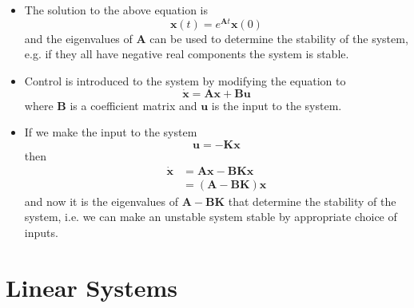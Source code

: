 \documentclass{article}
\renewcommand{\vec}[1]{\boldsymbol{\mathbf{#1}}}
\newcommand{\dvec}[1]{\dot{\vec{#1}}}
\begin{document}
\begin{itemize}
  \item The solution to the above equation is \[\vec{x}(t) = e^{\vec{A} t} \vec{x}(0)\] and the eigenvalues of $\vec{A}$ can be used to determine the stability of the system, e.g. if they all have negative real components the system is stable.

  \item Control is introduced to the system by modifying the equation to \[\dvec{x} = \vec{A} \vec{x} + \vec{B} \vec{u}\] where $\vec{B}$ is a coefficient matrix and $\vec{u}$ is the input to the system.

  \item If we make the input to the system \[\vec{u} = -\vec{K} \vec{x}\] then \begin{align*}
          \dvec{x} & = \vec{A} \vec{x} - \vec{B} \vec{K} \vec{x} \\
                   & = (\vec{A} - \vec{B} \vec{K}) \vec{x}
        \end{align*} and now it is the eigenvalues of $\vec{A} - \vec{B} \vec{K}$ that determine the stability of the system, i.e. we can make an unstable system stable by appropriate choice of inputs.
\end{itemize}

\section{Linear Systems}
\end{document}
